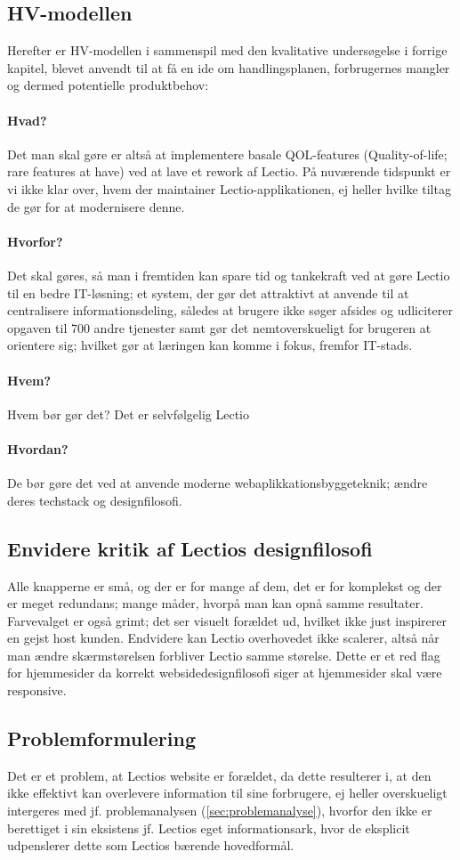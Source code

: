 \subsection{HV-modellen}
Herefter er HV-modellen i sammenspil med den kvalitative undersøgelse i forrige kapitel, blevet anvendt til at få en ide om handlingsplanen, forbrugernes mangler og dermed potentielle produktbehov:
\paragraph{Hvad?}
    Det man skal gøre er altså at implementere basale QOL-features (Quality-of-life; rare features at have) ved at lave et rework af Lectio. På nuværende tidspunkt er vi ikke klar over, hvem der maintainer Lectio-applikationen, ej heller hvilke tiltag de gør for at modernisere denne.
\paragraph{Hvorfor?}
    Det skal gøres, så man i fremtiden kan spare tid og tankekraft ved at gøre Lectio til en bedre IT-løsning; et system, der gør det attraktivt at anvende til at centralisere informationsdeling, således at brugere ikke søger afsides og udliciterer opgaven til 700 andre tjenester samt gør det nemtoverskueligt for brugeren at orientere sig; hvilket gør at læringen kan komme i fokus, fremfor IT-stads. 
\paragraph{Hvem?}
    Hvem bør gør det? Det er selvfølgelig Lectio
\paragraph{Hvordan?}
    De bør gøre det ved at anvende moderne webaplikkationsbyggeteknik; ændre deres techstack og designfilosofi.

\subsection{Envidere kritik af Lectios designfilosofi}
    Alle knapperne er små, og der er for mange af dem, det er for komplekst og der er meget redundans; mange måder, hvorpå man kan opnå samme resultater. 
    Farvevalget er også grimt; det ser visuelt forældet ud, hvilket ikke just inspirerer en gejst host kunden.
    Endvidere kan Lectio overhovedet ikke scalerer, altså når man ændre skærmstørelsen forbliver Lectio samme størelse. Dette er et red flag for hjemmesider da korrekt websidedesignfilosofi
    siger at hjemmesider skal være responsive.

\subsection{Problemformulering}
    Det er et problem, at Lectios website er forældet, da dette resulterer i, at den ikke effektivt kan overlevere information til sine forbrugere, ej heller overskueligt intergeres med jf. problemanalysen (\ref{sec:problemanalyse}), hvorfor den ikke er berettiget i sin eksistens jf. Lectios eget informationsark, hvor de eksplicit udpenslerer dette som Lectios bærende hovedformål\cite{lectioark}.